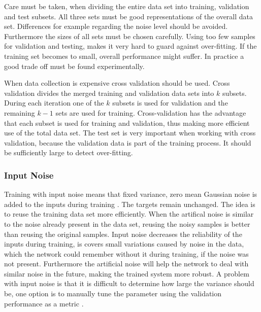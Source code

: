 Care must be taken, when dividing the entire data set into training, validation and test subsets. All three sets must be good representations of the overall data set. Differences for example regarding the noise level should be avoided. Furthermore the sizes of all sets must be chosen carefully. Using too few samples for validation and testing, makes it very hard to guard against over-fitting. If the training set becomes to small, overall performance might suffer. In practice a good trade off must be found experimentally.

When data collection is expensive cross validation should be used. Cross validation divides the merged training and validation data sets into $k$ subsets. During each iteration one of the $k$ subsets is used for validation and the remaining $k-1$ sets are used for training. Cross-validation has the advantage that each subset is used for training and validation, thus making more efficient use of the total data set. The test set is very important when working with cross validation, because the validation data is part of the training process. It should be sufficiently large to detect over-fitting.


\subsubsection{Input Noise}
Training with input noise means that fixed variance, zero mean Gaussian noise is added to the inputs during training \cite[page 32]{Graves2012}. The targets remain unchanged. The idea is to reuse the training data set more efficiently. When the artifical noise is similar to the noise already present in the data set, reusing the noisy samples is better than reusing the original samples. Input noise decreases the reliability of the inputs during training, is covers small variations caused by noise in the data, which the network could remember without it during training, if the noise was not present. Furthermore the artificial noise will help the network to deal with similar noise in the future, making the trained system more robust.
A problem with input noise is that it is difficult to determine how large the variance should be, one option is to manually tune the parameter using the validation performance as a metric \cite[page 32]{Graves2012}.

